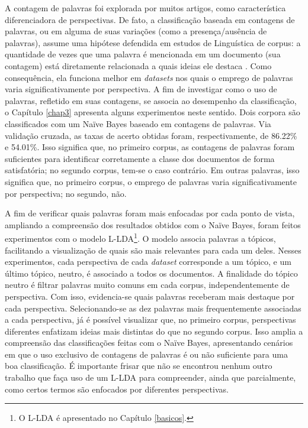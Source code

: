 A contagem de palavras foi explorada por muitos artigos, como característica diferenciadora de perspectivas. De fato, a classificação baseada em contagens de palavras, ou em alguma de suas variações (como a presença/ausência de palavras), assume uma hipótese defendida em estudos de Linguística de corpus: a quantidade de vezes que uma palavra é mencionada em um documento (sua contagem) está diretamente relacionada a quais ideias ele destaca \cite{teubert}. Como consequência, ela funciona melhor em \emph{datasets} nos quais o emprego de palavras varia significativamente por perspectiva. A fim de investigar como o uso de palavras, refletido em suas contagens, se associa ao desempenho da classificação, o Capítulo \ref{chap3} apresenta alguns experimentos neste sentido. Dois corpora são classificados com um Naïve Bayes baseado em contagens de palavras. Via validação cruzada, as taxas de acerto obtidas foram, respectivamente, de 86.22\% e 54.01\%. Isso significa que, no primeiro corpus, as contagens de palavras foram suficientes para identificar corretamente a classe dos documentos de forma satisfatória; no segundo corpus, tem-se o caso contrário. Em outras palavras, isso significa que, no primeiro corpus, o emprego de palavras varia significativamente por perspectiva; no segundo, não. 

A fim de verificar quais palavras foram mais enfocadas por cada ponto de vista, ampliando a compreensão dos resultados obtidos com o Naïve Bayes, foram feitos experimentos com o modelo L-LDA\footnote{O L-LDA é apresentado no Capítulo \ref{basicos}.}. O modelo associa palavras a tópicos, facilitando a visualização de quais são mais relevantes para cada um deles. Nesses experimentos, cada perspectiva de cada \emph{dataset} corresponde a um tópico, e um último tópico, neutro, é associado a todos os documentos. A finalidade do tópico neutro é filtrar palavras muito comuns em cada corpus, independentemente de perspectiva. Com isso, evidencia-se quais palavras receberam mais destaque por cada perspectiva. Selecionando-se as dez palavras mais frequentemente associadas a cada perspectiva, já é possível visualizar que, no primeiro corpus, perspectivas diferentes enfatizam ideias mais distintas do que no segundo corpus. Isso amplia a compreensão das classificações feitas com o Naïve Bayes, apresentando cenários em que o uso exclusivo de contagens de palavras é ou não suficiente para uma boa classificação. É importante frisar que não se encontrou nenhum outro trabalho que faça uso de um L-LDA para compreender, ainda que parcialmente, como certos termos são enfocados por diferentes perspectivas.

